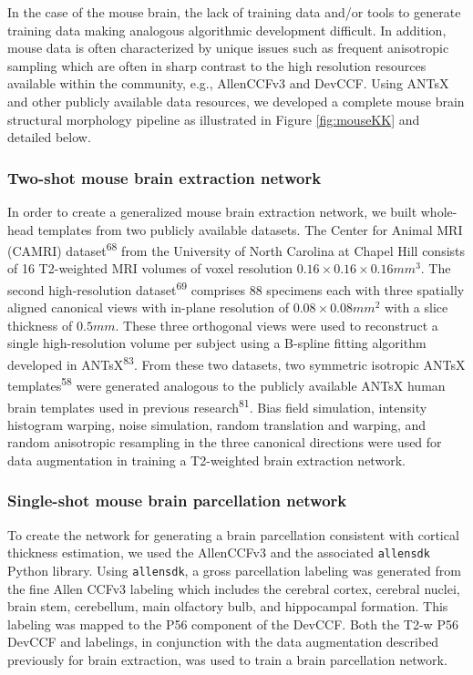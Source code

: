 \documentclass[
  12pt,
]{article}
\begin{document}
In the case of the mouse brain, the lack of training data and/or tools
to generate training data making analogous algorithmic development
difficult. In addition, mouse data is often characterized by unique
issues such as frequent anisotropic sampling which are often in sharp
contrast to the high resolution resources available within the
community, e.g., AllenCCFv3 and DevCCF. Using ANTsX and other publicly
available data resources, we developed a complete mouse brain structural
morphology pipeline as illustrated in Figure \ref{fig:mouseKK} and
detailed below.

\subsubsection{Two-shot mouse brain extraction
network}\label{two-shot-mouse-brain-extraction-network}

In order to create a generalized mouse brain extraction network, we
built whole-head templates from two publicly available datasets. The
Center for Animal MRI (CAMRI) dataset\textsuperscript{68} from the
University of North Carolina at Chapel Hill consists of 16 T2-weighted
MRI volumes of voxel resolution \(0.16 \times 0.16 \times 0.16 mm^3\).
The second high-resolution dataset\textsuperscript{69} comprises 88
specimens each with three spatially aligned canonical views with
in-plane resolution of \(0.08 \times
0.08 mm^2\) with a slice thickness of \(0.5 mm\). These three orthogonal
views were used to reconstruct a single high-resolution volume per
subject using a B-spline fitting algorithm developed in
ANTsX\textsuperscript{83}. From these two datasets, two symmetric
isotropic ANTsX templates\textsuperscript{58} were generated analogous
to the publicly available ANTsX human brain templates used in previous
research\textsuperscript{81}. Bias field simulation, intensity histogram
warping, noise simulation, random translation and warping, and random
anisotropic resampling in the three canonical directions were used for
data augmentation in training a T2-weighted brain extraction network.

\subsubsection{Single-shot mouse brain parcellation
network}\label{single-shot-mouse-brain-parcellation-network}

To create the network for generating a brain parcellation consistent
with cortical thickness estimation, we used the AllenCCFv3 and the
associated \texttt{allensdk} Python library. Using \texttt{allensdk}, a
gross parcellation labeling was generated from the fine Allen CCFv3
labeling which includes the cerebral cortex, cerebral nuclei, brain
stem, cerebellum, main olfactory bulb, and hippocampal formation. This
labeling was mapped to the P56 component of the DevCCF. Both the T2-w
P56 DevCCF and labelings, in conjunction with the data augmentation
described previously for brain extraction, was used to train a brain
parcellation network.
\end{document}
